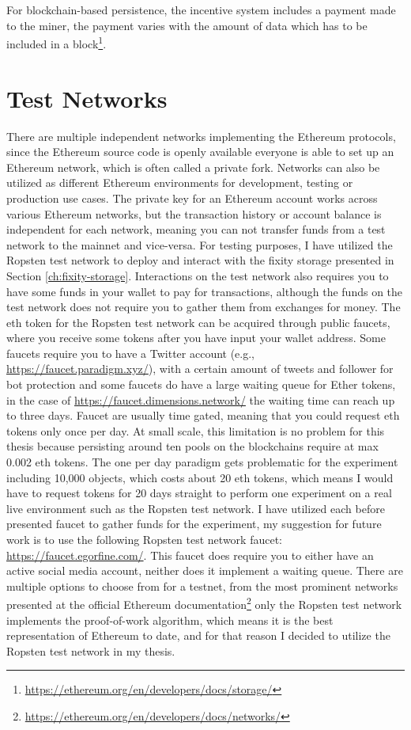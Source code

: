 For blockchain-based persistence, the incentive system includes a payment made to the miner, the payment varies with the amount of data which has to be included in a block\footnote{\url{https://ethereum.org/en/developers/docs/storage/}}.

\section{Test Networks}\label{sec:test-nets}
There are multiple independent networks implementing the Ethereum protocols, since the Ethereum source code is openly available everyone is able to set up an Ethereum network, which is often called a private fork. Networks can also be utilized as different Ethereum environments for development, testing or production use cases. The private key for an Ethereum account works across various Ethereum networks, but the transaction history or account balance is independent for each network, meaning you can not transfer funds from a test network to the mainnet and vice-versa. For testing purposes, I have utilized the Ropsten test network to deploy and interact with the fixity storage presented in Section \ref{ch:fixity-storage}. Interactions on the test network also requires you to have some funds in your wallet to pay for transactions, although the funds on the test network does not require you to gather them from exchanges for money. The \acrlong{eth} token for the Ropsten test network can be acquired through public faucets, where you receive some tokens after you have input your wallet address. Some faucets require you to have a Twitter account (e.g., \url{https://faucet.paradigm.xyz/}), with a certain amount of tweets and follower for bot protection and some faucets do have a large waiting queue for Ether tokens, in the case of \url{https://faucet.dimensions.network/} the waiting time can reach up to three days. Faucet are usually time gated, meaning that you could request \acrlong{eth} tokens only once per day. At small scale, this limitation is no problem for this thesis because persisting around ten pools on the blockchains require at max 0.002 \acrlong{eth} tokens. The one per day paradigm gets problematic for the experiment including 10,000 objects, which costs about 20 \acrlong{eth} tokens, which means I would have to request tokens for 20 days straight to perform one experiment on a real live environment such as the Ropsten test network. I have utilized each before presented faucet to gather funds for the experiment, my suggestion for future work is to use the following Ropsten test network faucet: \url{https://faucet.egorfine.com/}. This faucet does require you to either have an active social media account, neither does it implement a waiting queue.
There are multiple options to choose from for a testnet, from the most prominent networks presented at the official Ethereum documentation\footnote{\url{https://ethereum.org/en/developers/docs/networks/}} only the Ropsten test network implements the proof-of-work algorithm, which means it is the best representation of Ethereum to date, and for that reason I decided to utilize the Ropsten test network in my thesis.

